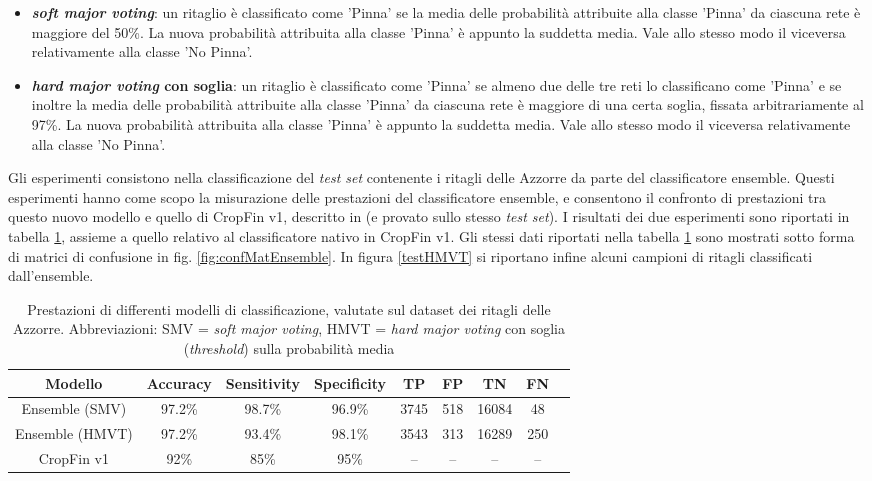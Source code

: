 \begin{itemize}

\item \textbf{\textit{soft major voting}}: un ritaglio è classificato come 'Pinna' se la media delle probabilità attribuite alla classe 'Pinna' da ciascuna rete è maggiore del 50\%. La nuova probabilità attribuita alla classe 'Pinna' è appunto la suddetta media. Vale allo stesso modo il viceversa relativamente alla classe 'No Pinna'.

\item \textbf{\textit{hard major voting} con soglia}: un ritaglio è classificato come 'Pinna' se almeno due delle tre reti lo classificano come 'Pinna' e se inoltre la media delle probabilità attribuite alla classe 'Pinna' da ciascuna rete è maggiore di una certa soglia, fissata arbitrariamente al 97\%. La nuova probabilità attribuita alla classe 'Pinna' è appunto la suddetta media. Vale allo stesso modo il viceversa relativamente alla classe 'No Pinna'.

\end{itemize}

Gli esperimenti consistono nella classificazione del \textit{test set} contenente i ritagli delle Azzorre da parte del classificatore ensemble. Questi esperimenti hanno come scopo la misurazione delle prestazioni del classificatore ensemble, e consentono il confronto di prestazioni tra questo nuovo modello e quello di CropFin v1, descritto in \cite{gianvito} (e provato sullo stesso \textit{test set}). I risultati dei due esperimenti sono riportati in tabella \ref{prestazioniEnsemble}, assieme a quello relativo al classificatore nativo in CropFin v1.
Gli stessi dati riportati nella tabella \ref{prestazioniEnsemble} sono mostrati sotto forma di matrici di confusione in fig. \ref{fig:confMatEnsemble}.
In figura \ref{testHMVT} si riportano infine alcuni campioni di ritagli classificati dall'ensemble.\\


\begin{table}[h]

  \centering
  \begin{adjustbox}{width=1\textwidth}
  \begin{tabular}{c c c c c c c c c}
  \hline
  Modello&Accuracy&Sensitivity&Specificity&TP&FP&TN&FN\\
  \hline
  Ensemble (SMV)&97.2\%&98.7\%&96.9\%&3745&518&16084&48\\
  Ensemble (HMVT)&97.2\%&93.4\%&98.1\%&3543&313&16289&250\\
  CropFin v1&92\%&85\%&95\%&--&--&--&--\\
  \hline
  \end{tabular}
  \end{adjustbox}
  
  \caption{Prestazioni di differenti modelli di classificazione, valutate sul dataset dei ritagli delle Azzorre. Abbreviazioni: SMV = \textit{soft major voting}, HMVT = \textit{hard major voting} con soglia (\textit{threshold}) sulla probabilità media}
  \label{prestazioniEnsemble}

\end{table}



